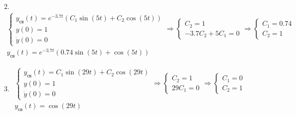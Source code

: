 \vspace{1em}
\begin{par}
\begin{flushleft}
2. $\begin{array}{l}
\left\lbrace \begin{array}{c}
y_{\textrm{св}} (t)=e^{-3.7t} (C_1 \sin (5t)+C_2 \cos (5t))\\
y(0)=1\\
\dot{y} (0)=0
\end{array}\right.\Rightarrow \left\lbrace \begin{array}{c}
C_2 =1\\
-3.7C_2 +5C_1 =0
\end{array}\right.\Rightarrow \left\lbrace \begin{array}{c}
C_1 =0.74\\
C_2 =1
\end{array}\right.\\
y_{\textrm{св}} (t)=e^{-3.7t} (0.74\sin (5t)+\cos (5t))
\end{array}$
\end{flushleft}
\end{par}


\vspace{1em}
\begin{par}
\begin{flushleft}
3. $\begin{array}{l}
\left\lbrace \begin{array}{c}
y_{св} (t)=C_1 \sin (29t)+C_2 \cos (29t)\\
y(0)=1\\
\dot{y} (0)=0
\end{array}\right.\Rightarrow \left\lbrace \begin{array}{c}
C_2 =1\\
29C_1 =0
\end{array}\right.\Rightarrow \left\lbrace \begin{array}{c}
C_1 =0\\
C_2 =1
\end{array}\right.\\
y_{\textrm{св}} (t)=\cos (29t)
\end{array}$
\end{flushleft}
\end{par}


